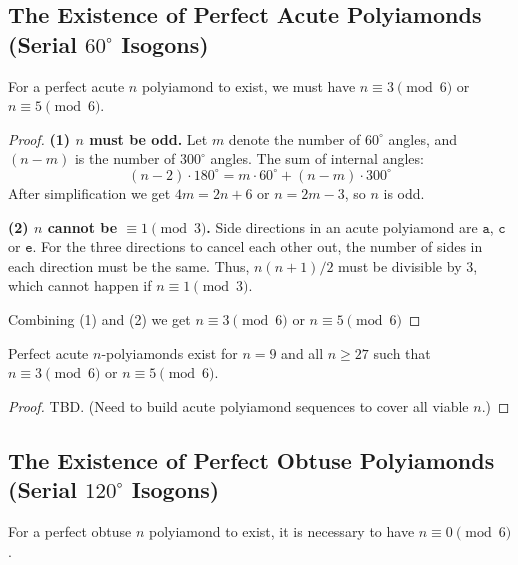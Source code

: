 \documentclass[utf8]{bjmc}
\begin{document}
\subsection{The Existence of Perfect Acute Polyiamonds (Serial $60^{\circ}$ Isogons)}


\begin{theorem}
For a perfect acute $n$ polyiamond to exist, we must have $n \equiv 3 \pmod 6$ or $n \equiv 5 \pmod 6$. 
\end{theorem}

\begin{proof}
{\bf (1) $n$ must be odd.} Let $m$ denote the number of $60^{\circ}$ angles, 
and $(n-m)$ is the number of $300^{\circ}$ angles. The sum of internal angles: 
\[ (n-2) \cdot 180^\circ = m \cdot 60^\circ + (n-m) \cdot 300^\circ \]
After simplification we get $4m = 2n + 6$ or $n = 2m - 3$, so $n$ is odd.

{\bf (2) $n$ cannot be $\equiv 1 \pmod 3$.} 
Side directions in an acute polyiamond are $\mathtt{a}$, $\mathtt{c}$ or $\mathtt{e}$. 
For the three directions to cancel each other out, the number of sides in each direction must be the same.
Thus, $n(n+1)/2$ must be divisible by $3$, which cannot happen if $n \equiv 1 \pmod 3$.

Combining (1) and (2) we get  $n \equiv 3 \pmod 6$ or $n \equiv 5 \pmod 6$
\end{proof}

\begin{theorem}
Perfect acute $n$-polyiamonds exist for $n=9$ and all $n \geq 27$ such that $n \equiv 3 \pmod 6$ or $n \equiv 5 \pmod 6$.
\end{theorem}

\begin{proof}
TBD. (Need to build acute polyiamond sequences to cover all viable $n$.)
\end{proof}




\subsection{The Existence of Perfect Obtuse Polyiamonds (Serial $120^{\circ}$ Isogons)}


\begin{theorem}
For a perfect obtuse $n$ polyiamond to exist, it is necessary 
to have $n \equiv 0 \pmod 6$. 
\end{theorem}
\end{document}
